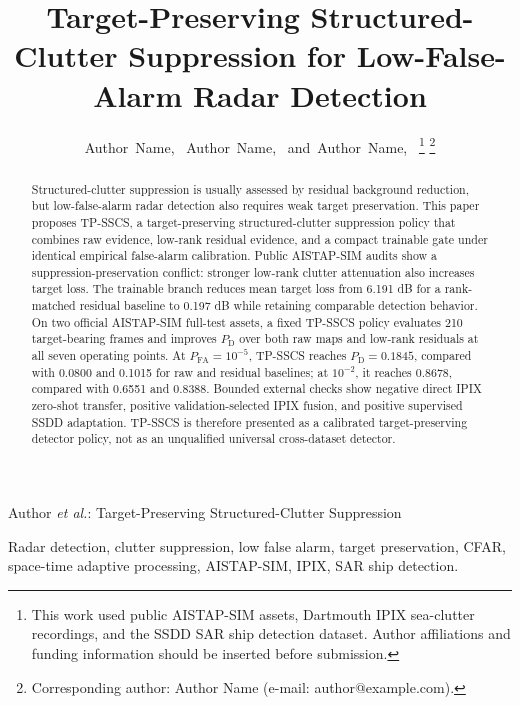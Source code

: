 \documentclass[journal]{IEEEtran}
\begin{document}
\title{Target-Preserving Structured-Clutter Suppression for Low-False-Alarm Radar Detection}

\author{Author~Name,~
        Author~Name,~
        and~Author~Name,~%
\thanks{This work used public AISTAP-SIM assets, Dartmouth IPIX sea-clutter recordings, and the SSDD SAR ship detection dataset. Author affiliations and funding information should be inserted before submission.}%
\thanks{Corresponding author: Author Name (e-mail: author@example.com).}}

%
{Author \MakeLowercase{\textit{et al.}}: Target-Preserving Structured-Clutter Suppression}

\maketitle

\begin{abstract}
Structured-clutter suppression is usually assessed by residual background reduction, but low-false-alarm radar detection also requires weak target preservation. This paper proposes TP-SSCS, a target-preserving structured-clutter suppression policy that combines raw evidence, low-rank residual evidence, and a compact trainable gate under identical empirical false-alarm calibration. Public AISTAP-SIM audits show a suppression-preservation conflict: stronger low-rank clutter attenuation also increases target loss. The trainable branch reduces mean target loss from 6.191 dB for a rank-matched residual baseline to 0.197 dB while retaining comparable detection behavior. On two official AISTAP-SIM full-test assets, a fixed TP-SSCS policy evaluates 210 target-bearing frames and improves $P_{\mathrm{D}}$ over both raw maps and low-rank residuals at all seven operating points. At $P_{\mathrm{FA}}=10^{-5}$, TP-SSCS reaches $P_{\mathrm{D}}=0.1845$, compared with 0.0800 and 0.1015 for raw and residual baselines; at $10^{-2}$, it reaches 0.8678, compared with 0.6551 and 0.8388. Bounded external checks show negative direct IPIX zero-shot transfer, positive validation-selected IPIX fusion, and positive supervised SSDD adaptation. TP-SSCS is therefore presented as a calibrated target-preserving detector policy, not as an unqualified universal cross-dataset detector.
\end{abstract}

\begin{IEEEkeywords}
Radar detection, clutter suppression, low false alarm, target preservation, CFAR, space-time adaptive processing, AISTAP-SIM, IPIX, SAR ship detection.
\end{IEEEkeywords}
\end{document}
